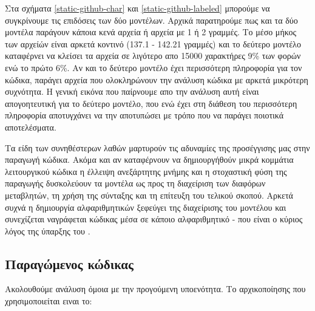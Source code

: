 Στα σχήματα \ref{static-github-char} και \ref{static-github-labeled} μπορούμε να συγκρίνουμε τις επιδόσεις των δύο μοντέλων.
Αρχικά παρατηρούμε πως και τα δύο μοντέλα παράγουν κάποια κενά αρχεία ή αρχεία με 1 ή 2 γραμμές.
Το μέσο μήκος των αρχείών είναι αρκετά κοντινό (137.1 - 142.21 γραμμές) και το δεύτερο μοντέλο καταφέρνει να κλείσει τα αρχεία σε λιγότερο απο 15000 χαρακτήρες 9\% των φορών ενώ το πρώτο 6\%.
Αν και το δεύτερο μοντέλο έχει περισσότερη πληροφορία για τον κώδικα, παράγει αρχεία που ολοκληρώνουν την ανάλυση κώδικα με αρκετά μικρότερη συχνότητα.
Η γενική εικόνα που παίρνουμε απο την ανάλυση αυτή είναι απογοητευτική για το δεύτερο μοντέλο, που ενώ έχει στη διάθεση του περισσότερη πληροφορία αποτυγχάνει να την αποτυπώσει με τρόπο που να παράγει ποιοτικά αποτελέσματα.

Τα είδη των συνηθέστερων λαθών μαρτυρούν τις αδυναμίες της προσέγγισης μας στην παραγωγή κώδικα.
Ακόμα και αν καταφέρνουν να δημιουργήθούν μικρά κομμάτια λειτουργικού κώδικα η έλλειψη ανεξάρτητης μνήμης και η στοχαστική φύση της παραγωγής δυσκολεύουν τα μοντέλα ως προς τη διαχείριση των διαφόρων μεταβλητών, τη χρήση της σύνταξης και τη επίτευξη του τελικού σκοπού.
Αρκετά συχνά η δημιουργία αλφαριθμητικών ξεφεύγει της διαχείρισης του μοντέλου και συνεχίζεται ναγράφεται κώδικας μέσα σε κάποιο αλφαριθμητικό - που είναι ο κύριος λόγος της ύπαρξης του .

\subsection{ Παραγώμενος κώδικας}

Ακολουθούμε ανάλυση όμοια με την προγούμενη υποενότητα. Το  αρχικοποίησης που χρησιμοποιείται ειναι το: 